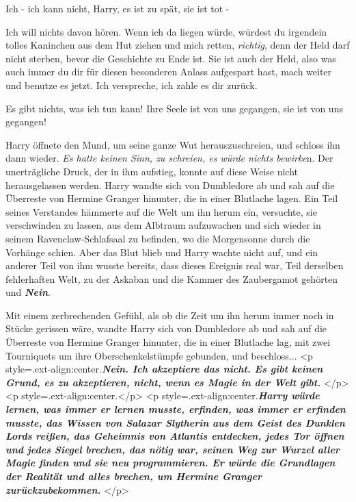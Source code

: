 \glqq Ich - ich kann nicht, Harry, es ist zu spät, sie ist tot -\grqq{}

\glqq Ich will nichts davon hören. Wenn ich da liegen würde, würdest du
irgendein tolles Kaninchen aus dem Hut ziehen und mich retten, \emph{richtig},
denn der Held darf nicht sterben, bevor die Geschichte zu Ende ist. Sie ist auch
der Held, also was auch immer du dir für diesen besonderen Anlass aufgespart
hast, mach weiter und benutze es jetzt. Ich verspreche, ich zahle es dir
zurück.\grqq{}

\glqq Es gibt nichts, was ich tun kann! Ihre Seele ist von uns gegangen, sie ist
von uns gegangen!\grqq{}

Harry öffnete den Mund, um seine ganze Wut herauszuschreien, und schloss ihn
dann wieder. \emph{Es hatte keinen Sinn, zu schreien, es würde nichts bewirke}n.
Der unerträgliche Druck, der in ihm aufstieg, konnte auf diese Weise nicht
herausgelassen werden. Harry wandte sich von Dumbledore ab und sah auf die
Überreste von Hermine Granger hinunter, die in einer Blutlache lagen. Ein Teil
seines Verstandes hämmerte auf die Welt um ihn herum ein, versuchte, sie
verschwinden zu lassen, aus dem Albtraum aufzuwachen und sich wieder in seinem
Ravenclaw-Schlafsaal zu befinden, wo die Morgensonne durch die Vorhänge schien.
Aber das Blut blieb und Harry wachte nicht auf, und ein anderer Teil von ihm
wusste bereits, dass dieses Ereignis real war, Teil derselben fehlerhaften Welt,
zu der Askaban und die Kammer des Zaubergamot gehörten und \textbf{\emph{Nein}}.

Mit einem zerbrechenden Gefühl, als ob die Zeit um ihn herum immer noch in
Stücke gerissen wäre, wandte Harry sich von Dumbledore ab und sah auf die
Überreste von Hermine Granger hinunter, die in einer Blutlache lag, mit zwei
Tourniquets um ihre Oberschenkelstümpfe gebunden, und beschloss...
\textbf{}
<p style=\grqq{}.ext-align:center\grqq{}.\textbf{\emph{Nein. Ich akzeptiere das
nicht. Es gibt keinen Grund, es zu akzeptieren, nicht, wenn es Magie in der Welt
gibt.}} </p> <p style=\grqq{}.ext-align:center\grqq{}.\textbf{}</p> <p
style=\grqq{}.ext-align:center\grqq{}.\textbf{\emph{Harry würde lernen, was
immer er lernen musste, erfinden, was immer er erfinden musste, das Wissen von
Salazar Slytherin aus dem Geist des Dunklen Lords reißen, das Geheimnis von
Atlantis entdecken, jedes Tor öffnen und jedes Siegel brechen, das nötig war,
seinen Weg zur Wurzel aller Magie finden und sie neu programmieren. Er würde die
Grundlagen der Realität und alles brechen, um Hermine Granger
zurückzubekommen.}} </p>

